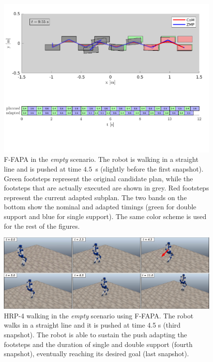 \begin{figure}
    \includegraphics[trim={0 2.2cm 0 8.6cm},clip,width=\textwidth]{figures/empty-fixed-plot-completing-task.pdf}
    \caption{F-FAPA in the {\em empty} scenario. The robot is walking in a
        straight line and is pushed at time $4.5$~s (slightly before the first
        snapshot). Green footsteps represent the original candidate plan, while
        the footsteps that are actually executed are shown in grey. Red
        footsteps represent the current adapted subplan. The two bands on the
        bottom show the nominal and adapted timings (green for double support
        and blue for single support). The same color scheme is used for the
        rest of the figures.
    }
    \label{fig:FAPA:matlab_empty}
\end{figure}

\begin{figure}
    \centering
    \includegraphics[width=\textwidth]{figures/empty-push-fixed-snapshots.jpeg}
    \caption{HRP-4 walking in the \textit{empty} scenario using F-FAPA.
        The robot walks in a straight line and it is pushed at time 4.5 s
        (third snapshot). The robot is able to sustain the push adapting the
        footsteps and the duration of single and double support
        (fourth snapshot), eventually reaching its desired goal (last snapshot).
    }
    \label{fig:FAPA:sim1:snapshots}
\end{figure}

